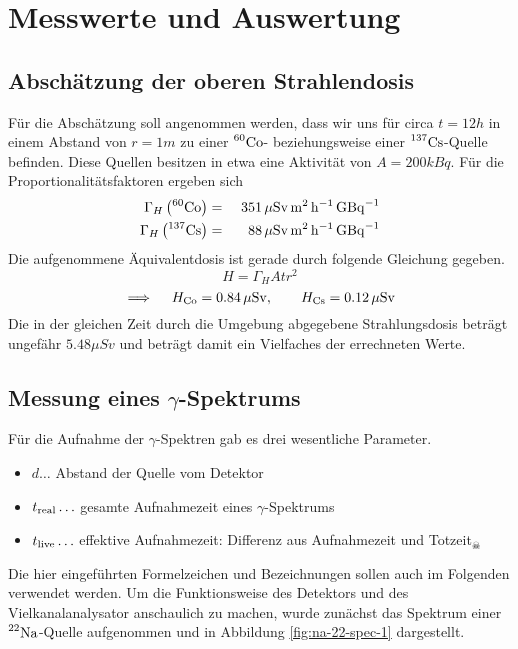 \section{Messwerte und Auswertung}
\label{sec:messwerte}
	
	\subsection{Abschätzung der oberen Strahlendosis}
	\label{ssec:strahlendosis}
	
		Für die Abschätzung soll angenommen werden, dass wir uns für circa $t = 12\unit{h}$ in einem Abstand von $r = 1\unit{m}$ zu einer $\prescript{60}{}{\mathrm{Co}}$- beziehungsweise einer $\prescript{137}{}{\mathrm{Cs}}$-Quelle befinden.
		Diese Quellen besitzen in etwa eine Aktivität von $A = 200\unit{kBq}$.
		Für die Proportionalitätsfaktoren ergeben sich
		\begin{alignat*}{3}
			\Gamma_H\left(  \prescript{60}{}{\mathrm{Co}}  \right) &=&\ 351 \, \mathrm{\mu Sv\, m^2 \, {h}^{-1} \, {GBq}^{-1}} \\
			\Gamma_H\left(  \prescript{137}{}{\mathrm{Cs}}  \right) &=&\ 88 \, \mathrm{\mu Sv\, m^2 \, {h}^{-1} \, {GBq}^{-1}}
		\end{alignat*}
		Die aufgenommene Äquivalentdosis ist gerade durch folgende Gleichung gegeben.
		\[
			H = \Gamma_H A t r^2
		\]
		\[
			\implies \quad H_{\mathrm{Co}} = 0.84 \, \mathrm{\mu Sv},\qquad H_{\mathrm{Cs}} = 0.12 \, \mathrm{\mu Sv}
		\]
		Die in der gleichen Zeit durch die Umgebung abgegebene Strahlungsdosis beträgt ungefähr $5.48\unit{\mu Sv}$ und beträgt damit ein Vielfaches der errechneten Werte.
	

	\FloatBarrier
	\subsection{Messung eines $\gamma$-Spektrums}
	\label{ssec:gamma-spektrum}

		Für die Aufnahme der $\gamma$-Spektren gab es drei wesentliche Parameter.
		\begin{itemize}
			\item $d\ldots$ Abstand der Quelle vom Detektor
			\item $t_{\mathrm{real}}\ldots$ gesamte Aufnahmezeit eines $\gamma$-Spektrums
			\item $t_{\mathrm{live}}\ldots$ effektive Aufnahmezeit: Differenz aus Aufnahmezeit und Totzeit$_\skull$
		\end{itemize}
		Die hier eingeführten Formelzeichen und Bezeichnungen sollen auch im Folgenden verwendet werden.
		Um die Funktionsweise des Detektors und des Vielkanalanalysator anschaulich zu machen, wurde zunächst das Spektrum einer $\prescript{22}{}{\mathrm{Na}}$-Quelle aufgenommen und in Abbildung \ref{fig:na-22-spec-1} dargestellt. 
	

